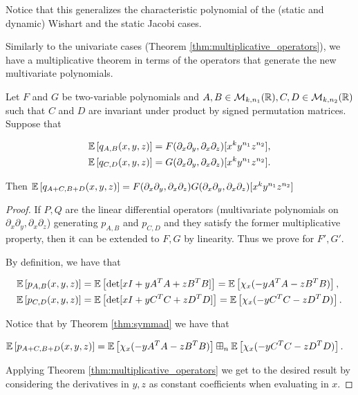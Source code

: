     Notice that this generalizes the characteristic polynomial of the (static and dynamic) Wishart and the static Jacobi cases. 

    Similarly to the univariate cases (Theorem \ref{thm:multiplicative_operators}), we have a multiplicative theorem in terms of the operators that generate the new multivariate polynomials.

    \begin{theorem} \label{thm:multivariate_operators}
        Let $F$ and $G$ be two-variable polynomials and $A,B \in \mathcal M_{k,n_1}(\mathbb R), C,D \in \mathcal M_{k,n_2}(\mathbb R)$ such that $C$ and $D$ are invariant under product by signed permutation matrices. Suppose that

         \begin{align*}
            \mathbb E \left[ q_{A,B}(x,y,z) \right] &= F(\partial_x \partial_y,\partial_x\partial_z)[x^ky^{n_1}z^{n_2}],\\ 
            \mathbb E \left[ q_{C,D}(x,y,z) \right] &= G(\partial_x \partial_y,\partial_x\partial_z)[x^ky^{n_1}z^{n_2}].
         \end{align*}

         Then $\mathbb E \left[ q_{A+C, B+D}(x,y,z) \right] = F(\partial_x \partial_y,\partial_x\partial_z)G(\partial_x \partial_y,\partial_x\partial_z)[x^ky^{n_1}z^{n_2}]$
    \end{theorem}

    \begin{proof}
        If $P,Q$ are the linear differential operators (multivariate polynomials on $\partial_x\partial_y, \partial_x\partial_z$) generating $p_{A,B}$ and $p_{C,D}$ and they satisfy the former multiplicative property, then it can be extended to $F,G$ by linearity. Thus we prove for $F', G'$. 


        By definition, we have that 
        
        \begin{align*}
            \mathbb E \left[  p_{A, B}(x,y,z)  \right] &= \mathbb E \left[  \det[ x I + y A^T A + z B^TB ]  \right] = \mathbb E \left[ \chi_x(-yA^TA -zB^TB) \right],\\
            \mathbb E \left[  p_{C, D}(x,y,z)  \right] &= \mathbb E \left[  \det[ x I + y C^TC + z D^TD ]  \right] = \mathbb E \left[ \chi_x(-yC^TC -zD^TD) \right].
        \end{align*}

        Notice that by Theorem \ref{thm:symmad} we have that

        \begin{align*}
            \mathbb E \left[ p_{A+C, B+D}(x,y,z) \right] &= \mathbb E \left[ \chi_x(-yA^TA -zB^TB) \right] \boxplus_n \mathbb E \left[ \chi_x(-yC^TC -zD^TD) \right].
        \end{align*}

        Applying Theorem \ref{thm:multiplicative_operators} we get to the desired result by considering the derivatives in $y,z$ as constant coefficients when evaluating in $x$.
    \end{proof}

